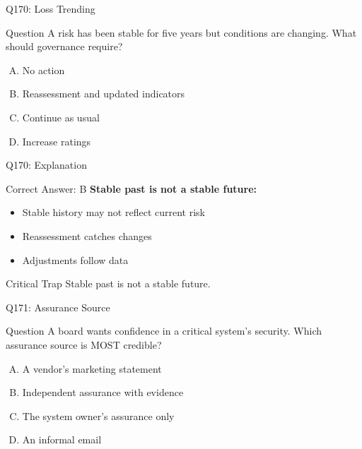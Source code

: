 \documentclass{beamer}
\begin{document}
	\begin{frame}{Q170: Loss Trending}
		\begin{block}{Question}
			A risk has been stable for five years but conditions are changing. What should governance require?
		\end{block}
		\begin{enumerate}[(A)]
			\item No action
			\item Reassessment and updated indicators
			\item Continue as usual
			\item Increase ratings
		\end{enumerate}
	\end{frame}
	
	\begin{frame}{Q170: Explanation}
		\begin{block}{Correct Answer: B}
			\textbf{Stable past is not a stable future:}
			\begin{itemize}
				\item Stable history may not reflect current risk
				\item Reassessment catches changes
				\item Adjustments follow data
			\end{itemize}
		\end{block}
		\begin{alertblock}{Critical Trap}
			Stable past is not a stable future.
		\end{alertblock}
	\end{frame}
	
	\begin{frame}{Q171: Assurance Source}
		\begin{block}{Question}
			A board wants confidence in a critical system's security. Which assurance source is MOST credible?
		\end{block}
		\begin{enumerate}[(A)]
			\item A vendor's marketing statement
			\item Independent assurance with evidence
			\item The system owner's assurance only
			\item An informal email
		\end{enumerate}
	\end{frame}
	
\end{document}
